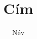 \documentclass{book}
\title{Cím}
\author{Név}
\begin{document}
\maketitle

\lipsum
\lipsum
\end{document}
